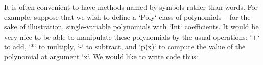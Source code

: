 It is often convenient to have methods named by symbols rather than words.
For example, suppose that we wish to define a \xcd`Poly` class of
polynomials -- for the sake of illustration, single-variable polynomials with
\xcd`Int` coefficients.  It would be very nice to be able to manipulate these
polynomials by the usual operations: \xcd`+` to add, \xcd`*` to multiply,
\xcd`-` to subtract, and \xcd`p(x)` to compute the value of the polynomial at
argument \xcd`x`.  We would like to write code thus: 
% 
% 
% 
% 
%   
% 
% 
% 

